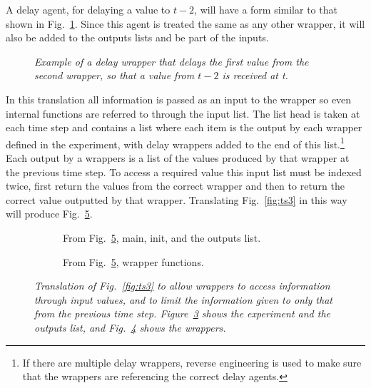 \documentclass{article}
\begin{document}
A delay agent, for delaying a value to $t-2$, will have a form similar to that shown in Fig.~\ref{fig:delay4}. Since this agent is treated the same as any other wrapper, it will also be added to the outputs lists and be part of the inputs. 
\begin{figure}[H]
	\centering
	
	\caption{\it Example of a delay wrapper that delays the first value from the second wrapper, so that a value from $t-2$ is received at t.}
	\label{fig:delay4}
\end{figure} 
  
In this translation all information is passed as an input to the wrapper so even internal functions are referred to through the input list. The list head is taken at each time step and contains a list where each item is the output by each wrapper defined in the experiment, with delay wrappers added to the end of this list.\footnote{If there are multiple delay wrappers, reverse engineering is used to make sure that the wrappers are referencing the correct delay agents.} Each output by a wrappers is a list of the values produced by that wrapper at the previous time step. To access a required value this input list must be indexed twice, first return the values from the correct wrapper and then to return the correct value outputted by that wrapper. Translating Fig.~\ref{fig:ts3} in this way will produce Fig.~\ref{fig:ts4}.
\begin{figure}[H]
	\centering
	\begin{subfigure}[b]{1\textwidth}
	
	\caption{From Fig.~\ref{fig:ts4}, main, init, and the outputs list.}
        \label{fig:gull}
	\end{subfigure}
	\caption*{}
\end{figure}
	
\begin{figure}[H]\ContinuedFloat
	\centering
	\begin{subfigure}[b]{1\textwidth}
	
	\caption{From Fig.~\ref{fig:ts4}, wrapper functions.}
        \label{fig:gull2}
	\end{subfigure}
	\caption{\it Translation of Fig.~\ref{fig:ts3} to allow wrappers to access information through input values, and to limit the information given to only that from the previous time step. Figure~\ref{fig:gull} shows the experiment and the outputs list, and Fig.~\ref{fig:gull2} shows the wrappers.}
	\label{fig:ts4}
\end{figure} 
\end{document}
